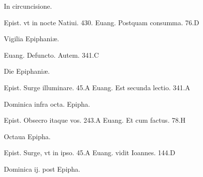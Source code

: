 \documentclass[a5paper,10pt]{book}
\def\ae{æ}
\begin{document}
\begin{multicols}{2}
\newline \vspace{-1.75em}
\begin{center}
\color{red} In circuncisione.
\end{center}
\vspace{-.75em}
\par \noindent Epist. vt in nocte Natiui. \hfill 430.
\newline Euang. Postquam consumma. \hfill 76.D
\newline \vspace{-1.75em}
\begin{center}
\color{red} Vigilia Epiphani\ae .
\end{center}
\vspace{-.75em}
\par \noindent Euang. Defuncto. Autem. \hfill 341.C
\newline \vspace{-1.75em}
\begin{center}
\color{red} Die Epiphani\ae .
\end{center}
\vspace{-.75em}
\par \noindent Epist. Surge illuminare. \hfill 45.A
\newline Euang. Est secunda lectio. \hfill 341.A
\newline \vspace{-1.75em}
\begin{center}
\color{red} Dominica infra octa. Epipha.
\end{center}
\vspace{-.75em}
\par \noindent Epist. Obsecro itaque vos. \hfill 243.A
\newline Euang. Et cum factus. \hfill 78.H
\newline \vspace{-1.75em}
\begin{center}
\color{red} Octaua Epipha.
\end{center}
\vspace{-.75em}
\par \noindent Epist. Surge, vt in ipso. \hfill 45.A
\newline Euang. vidit Ioannes. \hfill 144.D
\newline \vspace{-1.75em}
\begin{center}
\color{red} Dominica ij. post Epipha.
\end{center}
\vspace{-.75em}

\end{multicols}
\end{document}

